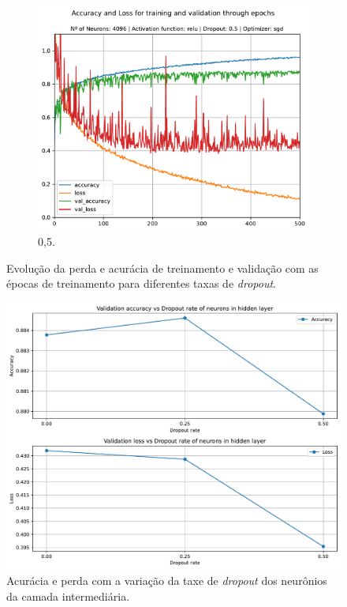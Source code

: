 \begin{figure}[H]
	\begin{subfigure}[H]{0.49\textwidth}
		\centering
		\includegraphics[width = \textwidth]{../../plot/mlp/mlp_4096_relu_0.5_sgd}
		\caption{0,5.}
		\label{fig:mlp_4096_relu_0.5_sgd}
	\end{subfigure}
	\caption{Evolução da perda e acurácia de treinamento e validação com as épocas de treinamento para diferentes taxas de \textit{dropout}.}
\end{figure}

\begin{figure}[H]
\centering
\includegraphics[width=0.75\linewidth]{../../plot/mlp/search_dropout}
\caption{Acurácia e perda com a variação da taxe de \textit{dropout} dos neurônios da camada intermediária.}
\label{fig:search_dropout}
\end{figure}

